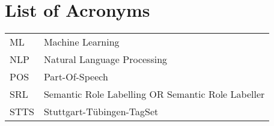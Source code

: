 {}
\chapter*{List of Acronyms}

\begin{supertabular}{lp{12.5cm}}
ML & Machine Learning\\
NLP & Natural Language Processing\\
POS & Part-Of-Speech\\
SRL & Semantic Role Labelling OR Semantic Role Labeller\\
STTS & Stuttgart-Tübingen-TagSet\\
\end{supertabular}

\newpage
